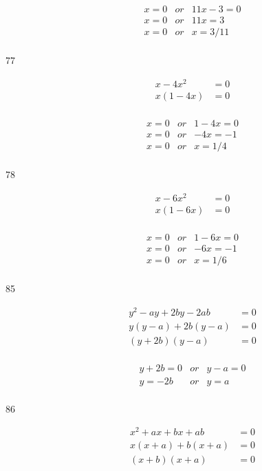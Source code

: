 \documentclass[fleqn,addpoints]{exam}
\begin{document}
\begin{description}
\begin{eqnarray*}
x = 0 &or& 11x - 3 = 0 \\
x = 0 &or& 11x = 3 \\
x = 0 &or& x = 3/11 \\
\end{eqnarray*}

\item[77]
\begin{align*}
  x - 4x^2 &= 0 \\
  x(1 - 4x) &= 0 \\
\end{align*}

\begin{eqnarray*}
  x = 0 &or& 1 - 4x = 0 \\
  x = 0 &or& -4x = -1 \\
  x = 0 &or& x = 1/4 \\
\end{eqnarray*}

\item[78]
\begin{align*}
  x - 6x^2 &= 0 \\
  x(1 - 6x) &= 0 \\
\end{align*}

\begin{eqnarray*}
  x = 0 &or& 1 - 6x = 0 \\
  x = 0 &or&  -6x = -1 \\
  x = 0 &or&  x = 1/6 \\
\end{eqnarray*}

\item[85]
\begin{align*}
  y^2 - ay + 2by - 2ab &= 0 \\
  y(y - a) + 2b(y - a) &= 0 \\
  (y + 2b)(y - a) &= 0 \\
\end{align*}

\begin{eqnarray*}
  y + 2b = 0 &or& y - a = 0 \\
  y = -2b &or& y = a \\
\end{eqnarray*}

\item[86]
\begin{align*}
  x^2 + ax + bx + ab &= 0 \\
  x(x + a) + b(x + a) &= 0 \\
  (x + b)(x + a) &= 0 \\
\end{align*}


\end{description}
\end{document}
